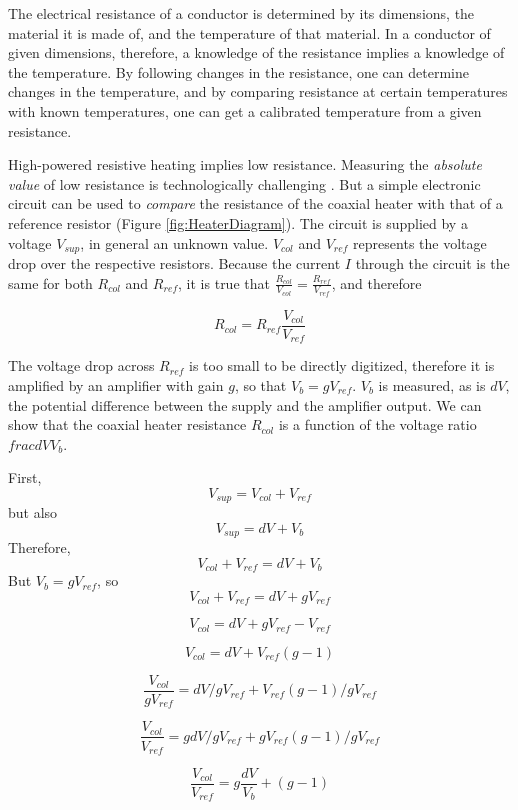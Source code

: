 The electrical resistance of a conductor is determined by its dimensions, the
material it is made of, and the temperature of that material. In a conductor of
given dimensions, therefore, a knowledge of the resistance implies a knowledge
of the temperature. By following changes in the resistance, one can determine
changes in the temperature, and by comparing resistance at certain temperatures
with known temperatures, one can get a calibrated temperature from a given
resistance.

High-powered resistive heating implies low resistance. Measuring the
\textit{absolute value} of low resistance is technologically challenging
\autocite{Dyos2012}. But a simple electronic circuit can be used to
\textit{compare} the resistance of the coaxial heater with that of a reference
resistor (Figure \ref{fig:HeaterDiagram}). The circuit is supplied by a voltage
$V_{sup}$, in general an unknown value.
$V_{col}$ and $V_{ref}$ represents the voltage drop over the respective
resistors. Because the current $I$ through the circuit is the same for both
$R_{col}$ and $R_{ref}$, it is true that
$\frac{R_{col}}{V_{col}}=\frac{R_{ref}}{V_{ref}}$, and therefore

\begin{equation}R_{col} = R_{ref}\frac{V_{col}}{V_{ref}}
\end{equation}

The voltage drop across $R_{ref}$ is too small to be directly digitized,
therefore it is amplified by an amplifier with gain $g$, so that $V_b =
gV_{ref}$. $V_b$ is measured, as is $dV$, the potential difference between the
supply and the amplifier output. We can show that the coaxial heater resistance
\(R_{col}\) is a function of the voltage ratio \(frac{dV}{V_b}\).

First, 
\[ V_{sup} = V_{col} + V_{ref} \] 
but also
\[ V_{sup} = dV + V_b \]
Therefore,
\[ V_{col} + V_{ref} = dV + V_b \]
But \(V_{b} = g V_{ref}\), so
\[ V_{col} + V_{ref} = dV + gV_{ref} \]

\[ V_{col} = dV + gV_{ref} - V_{ref} \]

\[ V_{col} = dV + V_{ref}(g - 1) \]

\[ \frac{\displaystyle V_{col}}{\displaystyle gV_{ref}} = dV/gV_{ref} + V_{ref}(g-1)/gV_{ref} \]

\[\frac{\displaystyle V_{col}}{\displaystyle V_{ref}} = gdV/gV_{ref} + gV_{ref}(g-1)/gV_{ref} \]

\[\frac{\displaystyle V_{col}}{\displaystyle V_{ref}} = g\frac{dV}{V_b} + (g-1) \]

